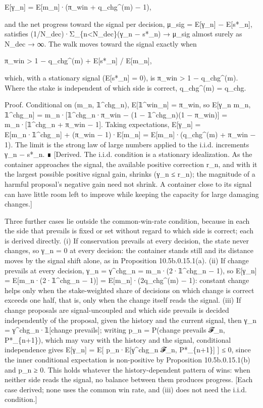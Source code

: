 \documentclass[
]{article}
\begin{document}
E{[}γ\_n{]} = E{[}m\_n{]}·(π\_win + q\_chg\^{}(m) − 1),

and the net progress toward the signal per decision, μ\_sig =
E{[}γ\_n{]} − E{[}s*\_n{]}, satisfies
(1/N\_dec)·Σ\_\{n\textless N\_dec\}(γ\_n − s*\_n) → μ\_sig almost surely
as N\_dec → ∞. The walk moves toward the signal exactly when

π\_win \textgreater{} 1 − q\_chg\^{}(m) + E{[}s*\_n{]} / E{[}m\_n{]},

which, with a stationary signal (E{[}s*\_n{]} = 0), is π\_win
\textgreater{} 1 − q\_chg\^{}(m). Where the stake is independent of
which side is correct, q\_chg\^{}(m) = q\_chg.

Proof. Conditional on (m\_n, 𝟙\^{}chg\_n), E{[}𝟙\^{}win\_n{]} = π\_win,
so E{[}γ\_n \textbar{} m\_n, 𝟙\^{}chg\_n{]} = m\_n·{[}𝟙\^{}chg\_n·π\_win
− (1 − 𝟙\^{}chg\_n)(1 − π\_win){]} = m\_n·{[}𝟙\^{}chg\_n + π\_win −
1{]}. Taking expectations, E{[}γ\_n{]} = E{[}m\_n·𝟙\^{}chg\_n{]} +
(π\_win − 1)·E{[}m\_n{]} = E{[}m\_n{]}·(q\_chg\^{}(m) + π\_win − 1). The
limit is the strong law of large numbers applied to the i.i.d.
increments γ\_n − s*\_n. ∎ {[}Derived. The i.i.d. condition is a
stationary idealization. As the container approaches the signal, the
available positive correction r\_n, and with it the largest possible
positive signal gain, shrinks (γ\_n ≤ r\_n); the magnitude of a harmful
proposal's negative gain need not shrink. A container close to its
signal can have little room left to improve while keeping the capacity
for large damaging changes.{]}

Three further cases lie outside the common-win-rate condition, because
in each the side that prevails is fixed or set without regard to which
side is correct; each is derived directly. (i) If conservation prevails
at every decision, the state never changes, so γ\_n = 0 at every
decision: the container stands still and its distance moves by the
signal shift alone, as in Proposition 10.5b.0.15.1(a). (ii) If change
prevails at every decision, γ\_n = γ\^{}chg\_n = m\_n·(2·𝟙\^{}chg\_n −
1), so E{[}γ\_n{]} = E{[}m\_n·(2·𝟙\^{}chg\_n − 1){]} =
E{[}m\_n{]}·(2q\_chg\^{}(m) − 1): constant change helps only when the
stake-weighted share of decisions on which change is correct exceeds one
half, that is, only when the change itself reads the signal. (iii) If
change proposals are signal-uncoupled and which side prevails is decided
independently of the proposal, given the history and the current signal,
then γ\_n = γ\^{}chg\_n·𝟙{[}change prevails{]}; writing p\_n = P(change
prevails \textbar{} 𝓕\_n, P*\_\{n+1\}), which may vary with the history
and the signal, conditional independence gives E{[}γ\_n{]} = E{[}
p\_n·E{[}γ\^{}chg\_n \textbar{} 𝓕\_n, P*\_\{n+1\}{]} {]} ≤ 0, since the
inner conditional expectation is non-positive by Proposition
10.5b.0.15.1(b) and p\_n ≥ 0. This holds whatever the history-dependent
pattern of wins: when neither side reads the signal, no balance between
them produces progress. {[}Each case derived; none uses the common win
rate, and (iii) does not need the i.i.d. condition.{]}
\end{document}
